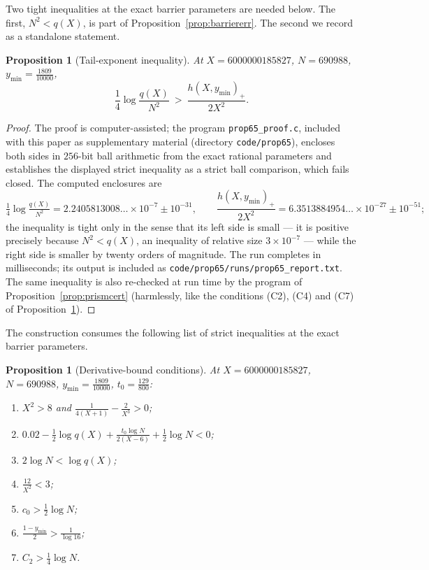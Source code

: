 \documentclass[11pt]{article}
\newtheorem{proposition}[theorem]{Proposition}
\theoremstyle{definition}
\begin{document}
Two tight inequalities at the exact barrier parameters are needed
below. The first, $N^2<q(X)$, is part of
Proposition~\ref{prop:barriererr}. The second we record as a
standalone statement.

\begin{proposition}[Tail-exponent inequality]\label{prop:tailexp}
At $X=6000000185827$, $N=690988$, $y_{\min}=\frac{1809}{10000}$,
\[
\frac14\log\frac{q(X)}{N^2}\ >\ \frac{h(X,y_{\min})_+}{2X^2} .
\]
\end{proposition}

\begin{proof}
The proof is computer-assisted; the program
\texttt{prop65\_proof.c}, included with this paper as
supplementary material (directory \texttt{code/prop65}),
encloses both sides in $256$-bit ball arithmetic from the exact
rational parameters and establishes the displayed strict
inequality as a strict ball comparison, which fails closed. The
computed enclosures are
\[
\tfrac14\log\tfrac{q(X)}{N^2}
=2.2405813008\ldots\times10^{-7}\pm10^{-31},
\qquad
\frac{h(X,y_{\min})_+}{2X^2}
=6.3513884954\ldots\times10^{-27}\pm10^{-51};
\]
the inequality is tight only in the sense that its left side is
small --- it is positive precisely because $N^2<q(X)$, an
inequality of relative size $3\times10^{-7}$ --- while the right
side is smaller by twenty orders of magnitude. The run completes in
milliseconds; its output is included as
\texttt{code/prop65/runs/prop65\_report.txt}. The same inequality
is also re-checked at run time by the program of
Proposition~\ref{prop:prismcert} (harmlessly, like the conditions
(C2), (C4) and (C7) of Proposition~\ref{prop:derivgates}).
\end{proof}

The construction consumes the following list of strict inequalities
at the exact barrier parameters.

\begin{proposition}[Derivative-bound conditions]\label{prop:derivgates}
At $X=6000000185827$, $N=690988$, $y_{\min}=\frac{1809}{10000}$,
$t_0=\frac{129}{800}$:
\begin{enumerate}
\item[\textup{(C1)}] $X^2>8$ and
$\frac1{4(X+1)}-\frac2{X^3}>0$;
\item[\textup{(C2)}] $0.02-\frac12\log q(X)
+\frac{t_0\log N}{2(X-6)}+\frac12\log N<0$;
\item[\textup{(C3)}] $2\log N<\log q(X)$;
\item[\textup{(C4)}] $\frac{12}{X^2}<3$;
\item[\textup{(C5)}] $c_0>\frac12\log N$;
\item[\textup{(C6)}] $\frac{1-y_{\min}}2>\frac1{\log16}$;
\item[\textup{(C7)}] $C_2>\frac14\log N$.
\end{enumerate}
\end{proposition}
\end{document}
